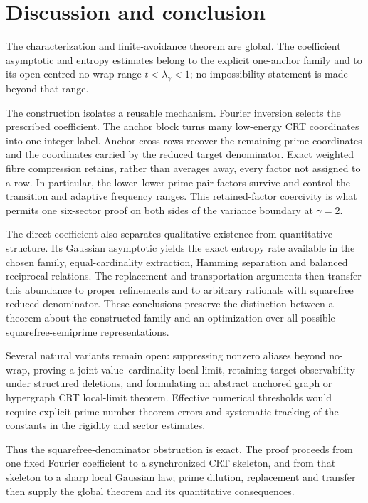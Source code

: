\section{Discussion and conclusion}
\label{sec:scope}

The characterization and finite-avoidance theorem are global.  The coefficient asymptotic and entropy estimates belong to the explicit one-anchor family and to its open centred no-wrap range $t<\lambda_\gamma<1$; no impossibility statement is made beyond that range.

The construction isolates a reusable mechanism.  Fourier inversion selects the prescribed coefficient.  The anchor block turns many low-energy CRT coordinates into one integer label.  Anchor-cross rows recover the remaining prime coordinates and the coordinates carried by the reduced target denominator.  Exact weighted fibre compression retains, rather than averages away, every factor not assigned to a row.  In particular, the lower--lower prime-pair factors survive and control the transition and adaptive frequency ranges.  This retained-factor coercivity is what permits one six-sector proof on both sides of the variance boundary at $\gamma=2$.

The direct coefficient also separates qualitative existence from quantitative structure.  Its Gaussian asymptotic yields the exact entropy rate available in the chosen family, equal-cardinality extraction, Hamming separation and balanced reciprocal relations.  The replacement and transportation arguments then transfer this abundance to proper refinements and to arbitrary rationals with squarefree reduced denominator.  These conclusions preserve the distinction between a theorem about the constructed family and an optimization over all possible squarefree-semiprime representations.

Several natural variants remain open: suppressing nonzero aliases beyond no-wrap, proving a joint value--cardinality local limit, retaining target observability under structured deletions, and formulating an abstract anchored graph or hypergraph CRT local-limit theorem.  Effective numerical thresholds would require explicit prime-number-theorem errors and systematic tracking of the constants in the rigidity and sector estimates.

Thus the squarefree-denominator obstruction is exact.  The proof proceeds from one fixed Fourier coefficient to a synchronized CRT skeleton, and from that skeleton to a sharp local Gaussian law; prime dilution, replacement and transfer then supply the global theorem and its quantitative consequences.

